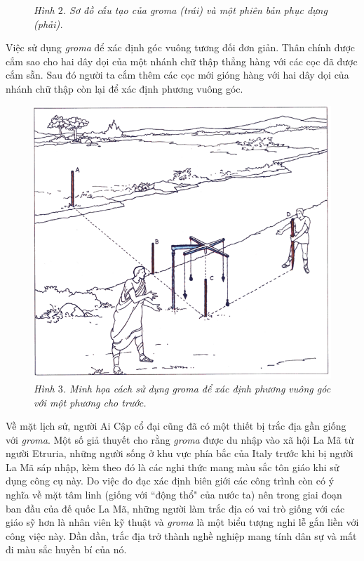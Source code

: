 \begin{multicols}{2}
\begin{figure}[H]
		\caption{\small\textit{\color{toanhocdoisong}Hình $2$. Sơ đồ cấu tạo của groma (trái) và một phiên bản phục dựng (phải).}}
		\vspace*{-10pt}
	\end{figure}
	Việc sử dụng \textit{groma} để xác định góc vuông tương đối đơn giản. Thân chính được cắm sao cho hai dây dọi của một nhánh chữ thập  thẳng hàng với các cọc đã được cắm sẵn. Sau đó người ta cắm thêm các cọc mới gióng hàng với hai dây dọi của nhánh chữ thập còn lại để xác định phương vuông góc.
	\begin{figure}[H]
		\vspace*{-5pt}
		\centering
		\captionsetup{labelformat= empty, justification=centering}
		\includegraphics[width= 1\linewidth]{3}
		\caption{\small\textit{\color{toanhocdoisong}Hình $3$. Minh họa cách sử dụng groma để xác định phương vuông góc với một phương cho trước.}}
		\vspace*{-10pt}
	\end{figure}
	Về mặt lịch sử, người Ai Cập cổ đại cũng đã có một thiết bị trắc địa gần giống với \textit{groma}. Một số giả thuyết cho rằng \textit{groma} được du nhập vào xã hội La Mã từ người Etruria, những người sống ở khu vực phía bắc của Italy trước khi bị người La Mã sáp nhập, kèm theo đó là các nghi thức mang màu sắc tôn giáo khi sử dụng công cụ này. Do việc đo đạc xác định biên giới các công trình còn có ý nghĩa về mặt tâm linh (giống với ``động thổ" của nước ta) nên trong giai đoạn ban đầu của đế quốc La Mã, những người làm trắc địa có vai trò giống với các giáo sỹ hơn là nhân viên kỹ thuật và \textit{groma} là một biểu tượng nghi lễ gắn liền với công việc này. Dần dần, trắc địa trở thành nghề nghiệp mang tính dân sự và mất đi màu sắc huyền bí của nó.

\end{multicols}
